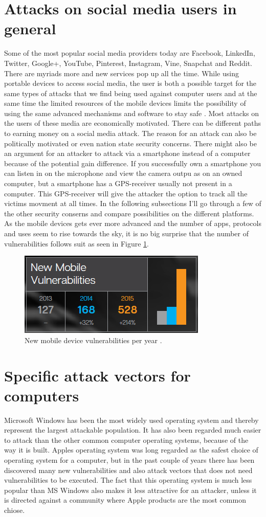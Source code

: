 \section{Attacks on social media users in general}
Some of the most popular social media providers today are Facebook, LinkedIn, Twitter, Google+, YouTube, Pinterest, Instagram, Vine, Snapchat and Reddit. There are myriads more and new services pop up all the time.
While using portable devices to access social media, the user is both a possible target for the same types of attacks that we find being used against computer users and at the same time the limited resources of the mobile devices limits the possibility of using the same advanced mechanisms and software to stay safe \cite{Zonouz2013215}.
Most attacks on the users of these media are economically motivated. There can be different paths to earning money on a social media attack. The reason for an attack can also be politically motivated or even nation state security concerns. There might also be an argument for an attacker to attack via a smartphone instead of a computer because of the potential gain difference. If you successfully own a smartphone you can listen in on the microphone and view the camera outpu as on an owned computer, but a smartphone has a GPS-receiver usually not present in a computer. This GPS-receiver will give the attacker the option to track all the victims movment at all times. In the following subsections I’ll go through a few of the other security conserns and compare possibilities on the different platforms.
As the mobile devices gets ever more advanced and the number of apps, protocols and uses seem to rise towards the sky, it is no big surprise that the number of vulnerabilities follows suit as seen in Figure \ref{fig:mobile_vulnerabilities}.
\begin{figure}
\centering
\includegraphics[width=0.5 \textwidth]{fig/mobile_vulnerabilities}
\caption{New mobile device vulnerabilities per year \cite{ISTR2016}.\label{fig:mobile_vulnerabilities}}
\end{figure}
\section{Specific attack vectors for computers}
Microsoft Windows has been the most widely used operating system and thereby represent the largest attackable population. It has also been regarded much easier to attack than the other common computer operating systems, because of the way it is built. 
Apples operating system was long regarded as the safest choice of operating system for a computer, but in the past couple of years there has been discovered many new vulnerabilities and also attack vectors that does not need vulnerabilities to be executed. The fact that this operating system is much less popular than MS Windows also makes it less attractive for an attacker, unless it is directed against a community where Apple products are the most common chiose.
